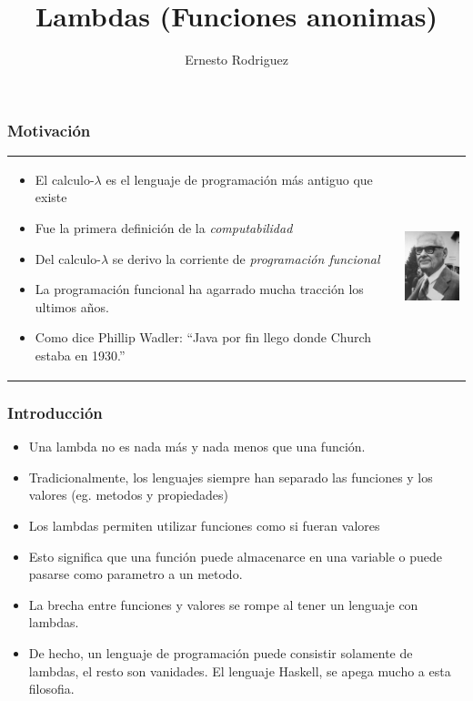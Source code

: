 \documentclass{beamer}
\title{Lambdas (Funciones anonimas)}
\author{Ernesto Rodriguez}
\institute{
    Universidad del Itsmo \\
    \medskip \textit{erodriguez@unis.edu.gt}
}
\date[\today]{}
\begin{document}
\begin{frame}
\titlepage
\end{frame}

\begin{frame}
    \frametitle{Motivaci\'on}
    \begin{tabular}{p{8cm} p{2cm}}
        {
            \begin{itemize}
                \item{El calculo-$\lambda$ es el lenguaje de programaci\'on m\'as antiguo que existe}
                \item{Fue la primera definici\'on de la \emph{computabilidad}}
                \item{Del calculo-$\lambda$ se derivo la corriente de \emph{programaci\'on funcional}}
                \item{La programaci\'on funcional ha agarrado mucha tracci\'on los ultimos a\~nos.}
                \item{Como dice Phillip Wadler\cite{PropsAsTypes}:
                ``Java por fin llego donde Church estaba en 1930.''}
            \end{itemize}
        } & \vspace{0cm}\includegraphics[width=2cm]{./church.jpg}
    \end{tabular}
\end{frame}

\begin{frame}
    \frametitle{Introducci\'on}
    \begin{itemize}
        \item{Una lambda no es nada m\'as y nada menos que una funci\'on.}
        \item{Tradicionalmente, los lenguajes siempre han separado las funciones
        y los valores (eg. metodos y propiedades)}
        \item{Los lambdas permiten utilizar funciones como si fueran valores}
        \item{Esto significa que una funci\'on puede almacenarce en una variable
        o puede pasarse como parametro a un metodo.}
        \item{La brecha entre funciones y valores se rompe al tener un lenguaje
        con lambdas.}
        \item{De hecho, un lenguaje de programaci\'on puede consistir solamente de
        lambdas, el resto son vanidades. El lenguaje Haskell\cite{Haskell}, se apega mucho
        a esta filosofia.}
    \end{itemize}
\end{frame}
\end{document}
